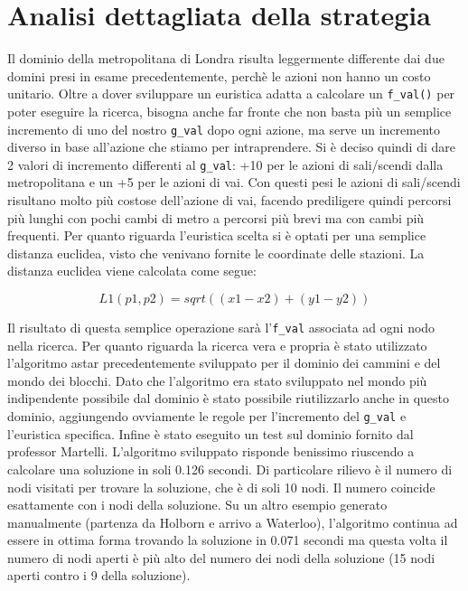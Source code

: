 \section{Analisi dettagliata della strategia}

Il dominio della metropolitana di Londra risulta leggermente differente dai due domini presi in esame precedentemente, perchè le azioni non hanno un costo unitario. Oltre a dover sviluppare un euristica adatta a calcolare un \lstinline{f_val()} per poter eseguire la ricerca, bisogna anche far fronte che non basta più un semplice incremento di uno del nostro \lstinline{g_val} dopo ogni azione, ma serve un incremento diverso in base all'azione che stiamo per intraprendere. Si è deciso quindi di dare 2 valori di incremento differenti al \lstinline{g_val}: +10 per le azioni di sali/scendi dalla metropolitana e un +5 per le azioni di vai. Con questi pesi le azioni di sali/scendi risultano molto più costose dell'azione di vai, facendo prediligere quindi percorsi più lunghi con pochi cambi di metro a percorsi più brevi ma con cambi più frequenti.
Per quanto riguarda l'euristica scelta si è optati per una semplice distanza euclidea, visto che venivano fornite le coordinate delle stazioni. La distanza euclidea viene calcolata come segue:

$$L1(p1,p2) = sqrt((x1 - x2)+(y1 - y2))$$

Il risultato di questa semplice operazione sarà l'\lstinline{f_val} associata ad ogni nodo nella ricerca.
Per quanto riguarda la ricerca vera e propria è stato utilizzato l'algoritmo astar precedentemente sviluppato per il dominio dei cammini e del mondo dei blocchi.
Dato che l'algoritmo era stato sviluppato nel mondo più indipendente possibile dal dominio è stato possibile riutilizzarlo anche in questo dominio, aggiungendo ovviamente le regole per l'incremento del \lstinline{g_val} e l'euristica specifica. Infine è stato eseguito un test sul dominio fornito dal professor Martelli. L'algoritmo sviluppato risponde benissimo riuscendo a calcolare una soluzione in soli 0.126 secondi. Di particolare rilievo è il numero di nodi visitati per trovare la soluzione, che è di soli 10 nodi. Il numero coincide esattamente con i nodi della soluzione. Su un altro esempio generato manualmente (partenza da Holborn e arrivo a Waterloo), l'algoritmo continua ad essere in ottima forma trovando la soluzione in 0.071 secondi ma questa volta il numero di nodi aperti è più alto del numero dei nodi della soluzione (15 nodi aperti contro i 9 della soluzione).

